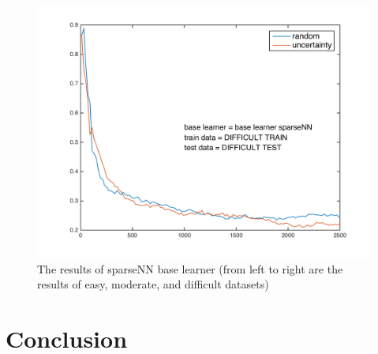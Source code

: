 \documentclass{article}
\begin{document}
\begin{figure}[h]
\begin{minipage}{.31\textwidth}
    \end{minipage}
    \hfill
    \centering
    \begin{minipage}{.31\textwidth}
      \centering
      \includegraphics[width=1\linewidth]{../sparseNN_difficult}
    \end{minipage}
    \caption{The results of sparseNN base learner (from left to right are the results of easy, moderate, and difficult datasets)}
    \label{fig:sparseNN}
  \end{figure}


\section{Conclusion}

{}

\end{document}
